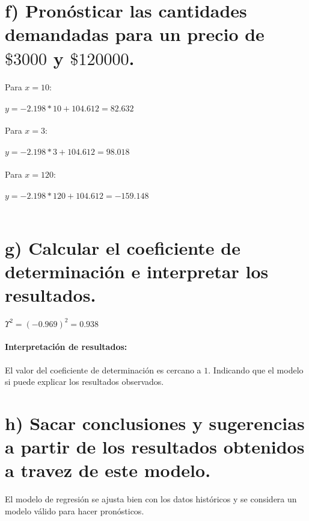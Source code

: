 \documentclass[12pt]{article}
\begin{document}
	\newpage
	
	\section*{f) Pronósticar las cantidades demandadas para un precio de $\$3000$ y $\$120000$.}
	
	Para $x=10$: \\ \\
	$y=-2.198*10+104.612=82.632$ \\ \\
	Para $x=3$: \\ \\
	$y=-2.198*3+104.612=98.018$ \\ \\
	Para $x=120$: \\ \\
	$y=-2.198*120+104.612=-159.148$ \\ \\
	
	\section*{g) Calcular el coeficiente de determinación e interpretar los resultados.}
	
	$\Upsilon^2=(-0.969)^2=0.938$
	\paragraph*{Interpretación de resultados:} \small{El valor del coeficiente de determinación es cercano a $1$. Indicando que el modelo si puede explicar los resultados observados.}
	
	\section*{h) Sacar conclusiones y sugerencias a partir de los resultados obtenidos a travez de este modelo.}
	
	\small{El modelo de regresión se ajusta bien con los datos históricos y se considera un modelo válido para hacer pronósticos.}
	
	
\end{document}
